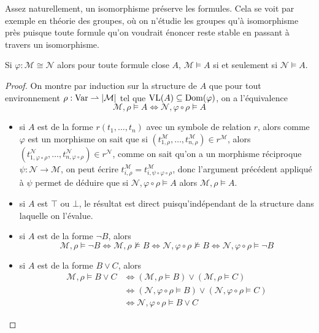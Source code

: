 Assez naturellement, un isomorphisme préserve les formules. Cela se voit par
exemple en théorie des groupes, où on n'étudie les groupes qu'à isomorphisme
près puisque toute formule qu'on voudrait énoncer reste stable en passant à
travers un isomorphisme.

\begin{proposition}
  Si $\varphi : \mathcal M \cong \mathcal N$ alors pour toute formule close $A$,
  $\mathcal M\models A$ si et seulement si $\mathcal N\models A$.
\end{proposition}

\begin{proof}
  On montre par induction sur la structure de $A$ que pour tout environnement
  $\rho : \operatorname{Var}\rightharpoonup |\mathcal M|$ tel que $\operatorname{VL}(A) \subseteq\operatorname{Dom}(\varphi)$,
  on a l'équivalence
  \[\mathcal M,\rho\models A \iff \mathcal N,\varphi\circ \rho\models A\]
  \begin{itemize}
  \item si $A$ est de la forme $r(t_1,\ldots,t_n)$ avec un symbole de relation
    $r$, alors comme $\varphi$ est un morphisme on sait que si
    $(t_{1,\rho}^\mathcal M,\ldots,t_{n,\rho}^\mathcal M)\in r^\mathcal M$, alors
    $(t_{1,\varphi\circ \rho}^\mathcal N,\ldots,
    t_{n,\varphi\circ\rho}^\mathcal N)\in r^{\mathcal N}$, comme on sait qu'on a
    un morphisme réciproque $\psi : \mathcal N \to \mathcal M$, on peut
    écrire $t_{i,\rho}^\mathcal M = t_{i,\psi\circ\varphi\circ\rho}^\mathcal M$, donc
    l'argument précédent appliqué à $\psi$ permet de déduire que si
    $\mathcal N,\varphi\circ \rho\models A$ alors $\mathcal M,\rho\models A$.
  \item si $A$ est $\top$ ou $\bot$, le résultat est direct puisqu'indépendant
    de la structure dans laquelle on l'évalue.
  \item si $A$ est de la forme $\lnot B$, alors
    \[\mathcal M, \rho\models \lnot B\iff \mathcal M, \rho\not\models B
    \iff \mathcal N,\varphi\circ\rho\not\models B
    \iff \mathcal N,\varphi\circ\rho\models \lnot B\]
  \item si $A$ est de la forme $B\lor C$, alors
    \begin{align*}
      \mathcal M, \rho \models B\lor C &\iff (\mathcal M,\rho\models B)\lor
      (\mathcal M,\rho\models C) \\
      &\iff (\mathcal N,\varphi\circ\rho\models B)\lor
      (\mathcal N,\varphi\circ\rho\models C)\\
      &\iff \mathcal N,\varphi\circ \rho \models B\lor C
      \end{align*}

\end{itemize}
\end{proof}

